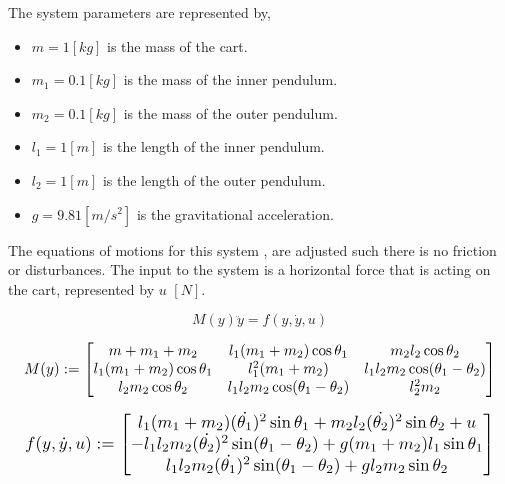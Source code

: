 \documentclass[final]{LTHtwocol} %
\begin{document}
The system parameters are represented by,
\begin{itemize}
\item $m = 1 [kg]$ is the mass of the cart.
\item $m_1 = 0.1 [kg]$ is the mass of the inner pendulum.
\item $m_2 = 0.1[kg]$ is the mass of the outer pendulum.
\item $l_1 = 1 [m]$ is the length of the inner pendulum.
\item $l_2 = 1[m]$ is the length of the outer pendulum.
\item $g = 9.81 [m/s^2]$ is the gravitational acceleration.
 \end{itemize}

The equations of motions for this system \cite{Double_Pendulum_Equations}, are adjusted such there is no friction or disturbances.
The input to the system is a horizontal force that is acting on the cart, represented by $u$ $[N]$.

\begin{equation}
M(y) \ddot{y} = f(y,\dot{y},u)
\label{eq_rhs_double_pendulum}
\end{equation}


\begin{equation}
\resizebox{ \columnwidth}{!}
{
$
M(y) :=
\begin{bmatrix}
m + m_1 +m_2 & l_1(m_1+m_2)\cos \theta_1 & m_2 l_2 \cos \theta_2 \\
l_1 (m_1 + m_2) \cos \theta_1 & l_1^2(m_1+m_2) & l_1 l_2 m_2 \cos(\theta_1 - \theta_2) \\
l_2 m_2 \cos \theta_2 & l_1 l_2 m_2 \cos (\theta_1 - \theta_2) & l_2^2 m_2
\end{bmatrix}
$
}
\end{equation}

\begin{equation}
\resizebox{ \columnwidth}{!}
{
$
f(y,\dot{y},u) :=
\begin{bmatrix}
l_1(m_1+m_2) (\dot{\theta_1})^2 \sin \theta_1 + m_2 l_2 (\dot{\theta_2})^2 \sin \theta_2 + u\\
-l_1l_2m_2(\dot{\theta_2})^2 \sin(\theta_1 - \theta_2) + g(m_1 + m_2)l_1 \sin \theta_1 \\
l_1l_2m_2(\dot{\theta_1})^2 \sin (\theta_1 - \theta_2) + g l_2 m_2 \sin \theta_2
\end{bmatrix}
 $
 }
\end{equation}
\end{document}
